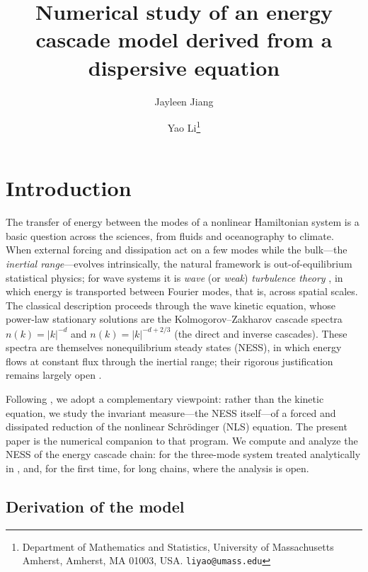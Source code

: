 \documentclass[11pt,a4paper]{article}
\title{Numerical study of an energy cascade model derived from a dispersive equation}
\author{Jayleen Jiang \and Yao Li\thanks{Department of Mathematics and Statistics, University of Massachusetts Amherst, Amherst, MA 01003, USA. \texttt{liyao@umass.edu}}}
\date{}
\theoremstyle{definition}
\numberwithin{equation}{section}   %
\begin{document}
\maketitle


\section{Introduction}

The transfer of energy between the modes of a nonlinear Hamiltonian system is a
basic question across the sciences, from fluids and oceanography to climate.
When external forcing and dissipation act on a few modes while the bulk---the
\emph{inertial range}---evolves intrinsically, the natural framework is
out-of-equilibrium statistical physics; for wave systems it is \emph{wave} (or
\emph{weak}) \emph{turbulence theory} \cite{Nazarenko}, in which energy is
transported between Fourier modes, that is, across spatial scales. The classical
description proceeds through the wave kinetic equation, whose power-law
stationary solutions are the Kolmogorov--Zakharov cascade spectra
$n(k)=|k|^{-d}$ and $n(k)=|k|^{-d+2/3}$ (the direct and inverse cascades). These
spectra are themselves nonequilibrium steady states (NESS), in which energy
flows at constant flux through the inertial range; their rigorous justification
remains largely open \cite{HLNS}.

Following \cite{HLNS}, we adopt a complementary viewpoint: rather than the
kinetic equation, we study the invariant measure---the NESS itself---of a
forced and dissipated reduction of the nonlinear Schr\"odinger (NLS) equation.
The present paper is the numerical companion to that program. We compute and
analyze the NESS of the energy cascade chain: for the three-mode system treated
analytically in \cite{HLNS}, and, for the first time, for long chains, where the
analysis is open.

\subsection{Derivation of the model}\label{sec:derivation}
\end{document}
